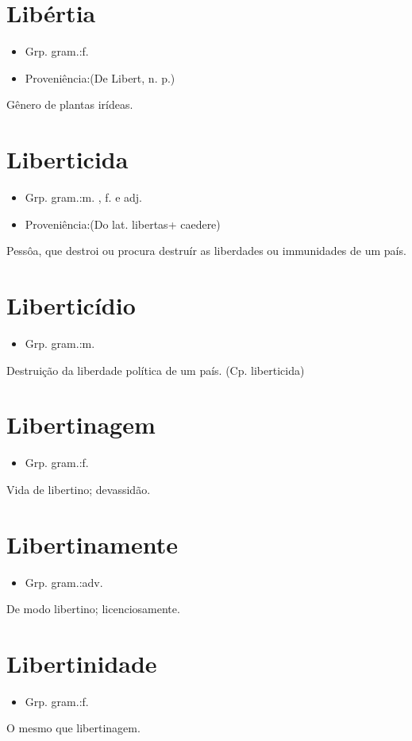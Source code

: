 \section{Libértia}
\begin{itemize}
\item {Grp. gram.:f.}
\end{itemize}
\begin{itemize}
\item {Proveniência:(De \textunderscore Libert\textunderscore , n. p.)}
\end{itemize}
Gênero de plantas irídeas.
\section{Liberticida}
\begin{itemize}
\item {Grp. gram.:m. ,  f.  e  adj.}
\end{itemize}
\begin{itemize}
\item {Proveniência:(Do lat. \textunderscore libertas\textunderscore  + \textunderscore caedere\textunderscore )}
\end{itemize}
Pessôa, que destroi ou procura destruír as liberdades ou immunidades de um país.
\section{Liberticídio}
\begin{itemize}
\item {Grp. gram.:m.}
\end{itemize}
Destruição da liberdade política de um país.
(Cp. \textunderscore liberticida\textunderscore )
\section{Libertinagem}
\begin{itemize}
\item {Grp. gram.:f.}
\end{itemize}
Vida de libertino; devassidão.
\section{Libertinamente}
\begin{itemize}
\item {Grp. gram.:adv.}
\end{itemize}
De modo libertino; licenciosamente.
\section{Libertinidade}
\begin{itemize}
\item {Grp. gram.:f.}
\end{itemize}
O mesmo que \textunderscore libertinagem\textunderscore .
